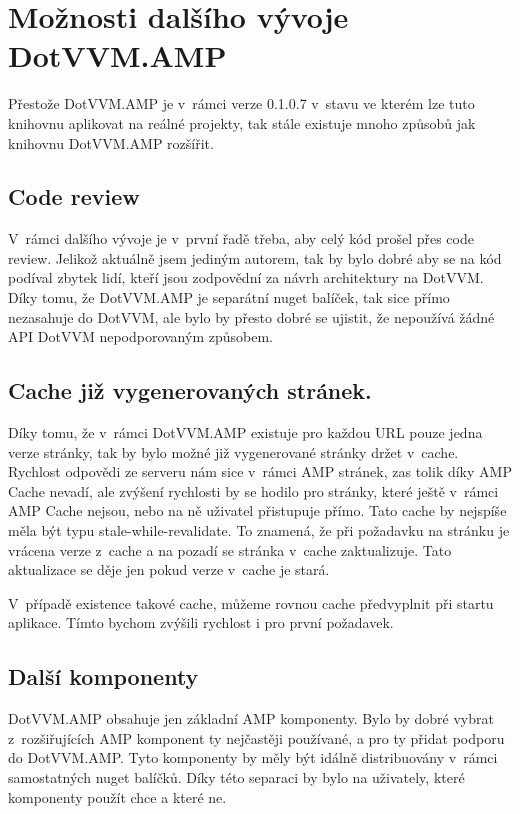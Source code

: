 \chapter{Možnosti dalšího vývoje DotVVM.AMP}
Přestože DotVVM.AMP je v~rámci verze 0.1.0.7 v~stavu ve kterém lze tuto knihovnu aplikovat na reálné projekty, tak stále existuje mnoho způsobů jak knihovnu DotVVM.AMP rozšířit.

\section{Code review}
V~rámci dalšího vývoje je v~první řadě třeba, aby celý kód prošel přes code review. Jelikož aktuálně jsem jediným autorem, tak by bylo dobré aby se na kód podíval zbytek lidí, kteří jsou zodpovědní za návrh architektury na DotVVM. Díky tomu, že DotVVM.AMP je separátní nuget balíček, tak sice přímo nezasahuje do DotVVM, ale bylo by přesto dobré se ujistit, že nepoužívá žádné API DotVVM nepodporovaným způsobem.

\section{Cache již vygenerovaných stránek.}
Díky tomu, že v~rámci DotVVM.AMP existuje pro každou URL pouze jedna verze stránky, tak by bylo možné již vygenerované stránky držet v~cache. Rychlost odpovědi ze serveru nám sice v~rámci AMP stránek, zas tolik díky AMP Cache nevadí, ale zvýšení rychlosti by se hodilo pro stránky, které ještě v~rámci AMP Cache nejsou, nebo na ně uživatel přistupuje přímo.
Tato cache by nejspíše měla být typu stale-while-revalidate. To znamená, že při požadavku na stránku je vrácena verze z~cache a na pozadí se stránka v~cache zaktualizuje. Tato aktualizace se děje jen pokud verze v~cache je stará.

V~případě existence takové cache, můžeme rovnou cache předvyplnit při startu aplikace. Tímto bychom zvýšili rychlost i pro první požadavek.

\section{Další komponenty}
DotVVM.AMP obsahuje jen základní AMP komponenty. Bylo by dobré vybrat z~rozšiřujících AMP komponent ty nejčastěji používané, a pro ty přidat podporu do DotVVM.AMP. Tyto komponenty by měly být idálně distribuovány v~rámci samostatných nuget balíčků. Díky této separaci by bylo na uživately, které komponenty použít chce a které ne.


